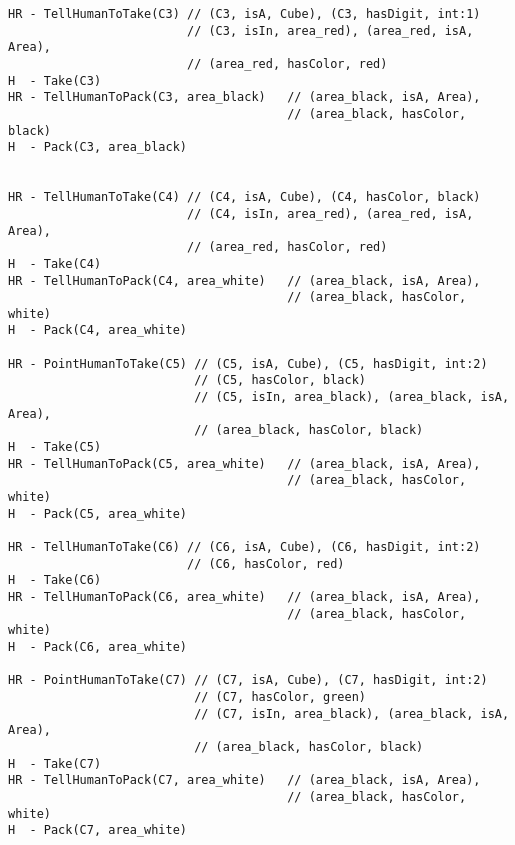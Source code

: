 \begin{lstlisting}[frame=single, basicstyle=\scriptsize\ttfamily, label={lst:chap5_case3}, caption={The \acrshort{hatp} solution for the third case study of Chapter~\ref{chap:5}. The robot chooses to point instead of verbalizing to designate the cubes 5 and 7. Please note the order of cube motions is not considered in this problem. The lines beginning with H represent the actions of the human and the lines beginning with HR represent actions involving the human and the robot (communication actions). In green are the \acrshort{reg} results for each communication action even if a pointing has been choose.}, captionpos=t, style=HatpPlan]
HR - TellHumanToTake(C3) // (C3, isA, Cube), (C3, hasDigit, int:1)
                         // (C3, isIn, area_red), (area_red, isA, Area),
                         // (area_red, hasColor, red)
H  - Take(C3)
HR - TellHumanToPack(C3, area_black)   // (area_black, isA, Area),
                                       // (area_black, hasColor, black)
H  - Pack(C3, area_black)


HR - TellHumanToTake(C4) // (C4, isA, Cube), (C4, hasColor, black)
                         // (C4, isIn, area_red), (area_red, isA, Area),
                         // (area_red, hasColor, red)
H  - Take(C4)
HR - TellHumanToPack(C4, area_white)   // (area_black, isA, Area),
                                       // (area_black, hasColor, white)
H  - Pack(C4, area_white)

HR - PointHumanToTake(C5) // (C5, isA, Cube), (C5, hasDigit, int:2)
                          // (C5, hasColor, black)
                          // (C5, isIn, area_black), (area_black, isA, Area),
                          // (area_black, hasColor, black)
H  - Take(C5)
HR - TellHumanToPack(C5, area_white)   // (area_black, isA, Area),
                                       // (area_black, hasColor, white)
H  - Pack(C5, area_white)

HR - TellHumanToTake(C6) // (C6, isA, Cube), (C6, hasDigit, int:2)
                         // (C6, hasColor, red)
H  - Take(C6)
HR - TellHumanToPack(C6, area_white)   // (area_black, isA, Area),
                                       // (area_black, hasColor, white)
H  - Pack(C6, area_white)

HR - PointHumanToTake(C7) // (C7, isA, Cube), (C7, hasDigit, int:2)
                          // (C7, hasColor, green)
                          // (C7, isIn, area_black), (area_black, isA, Area),
                          // (area_black, hasColor, black)
H  - Take(C7)
HR - TellHumanToPack(C7, area_white)   // (area_black, isA, Area),
                                       // (area_black, hasColor, white)
H  - Pack(C7, area_white)


\end{lstlisting}
